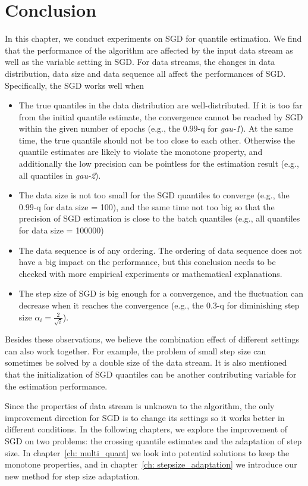 \section{Conclusion}
\label{sec: conclusion}
In this chapter, we conduct experiments on SGD for quantile estimation. We find that the performance of the algorithm are affected by the input data stream as well as the variable setting in SGD. For data streams, the changes in data distribution, data size and data sequence all affect the performances of SGD. Specifically, the SGD works well when
\begin{itemize}
    \item The true quantiles in the data distribution are well-distributed. If it is too far from the initial quantile estimate, the convergence cannot be reached by SGD within the given number of epochs (e.g., the $0.99$-q for \textit{gau-1}).
    At the same time, the true quantile should not be too close to each other. Otherwise 
    the quantile estimates are likely to violate the monotone property, and additionally the low precision can be pointless for the estimation result (e.g., all quantiles in \textit{gau-2}). 
    
    \item The data size is not too small for the SGD quantiles to converge (e.g., the $0.99$-q for data size = 100), and the same time not too big so that the precision of SGD estimation is close to the batch quantiles (e.g., all quantiles for data size = 100000)
    
    \item The data sequence is of any ordering. The ordering of data sequence does not have a big impact on the performance, but this conclusion needs to be checked with more empirical experiments or mathematical explanations.
    
    \item The step size of SGD is big enough for a convergence, and the fluctuation can decrease when it reaches the convergence (e.g., the $0.3$-q for diminishing step size $\alpha_i = \frac{2}{\sqrt{i}}$).
\end{itemize}

Besides these observations, we believe the combination effect of different settings can also work together. For example, the problem of small step size can sometimes be solved by a double size of the data stream. It is also mentioned that the initialization of SGD quantiles can be another contributing variable for the estimation performance. 

Since the properties of data stream is unknown to the algorithm, the only improvement direction for SGD is to change its settings so it works better in different conditions. In the following chapters, we explore the improvement of SGD on two problems: the crossing quantile estimates and the adaptation of step size. In chapter~\ref{ch: multi_quant} we look into potential solutions to keep the monotone properties, and in chapter~\ref{ch: stepsize_adaptation} we introduce our new method for step size adaptation.
% 
